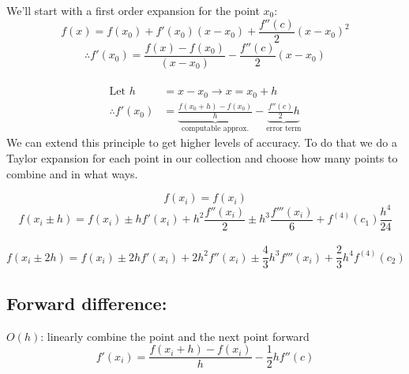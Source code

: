 \documentclass[12pt, answers]{exam}
\begin{document}
We'll start with a first order expansion for the point $x_0$:
\[
f(x) = f(x_0) + f'(x_0)(x - x_0) + \frac{f''(c)}{2}(x-x_0)^2 \]
\ifprintanswers
\[
\therefore f'(x_0) = \frac{f(x) - f(x_0)}{(x - x_0)} - \frac{f''(c)}{2}(x-x_0) \]
\else
\\\vspace*{2em}
\fi
%
\begin{align*}
\text{Let } h &= x-x_0 \rightarrow x = x_0 + h \\
%
\therefore f'(x_0) &= \underbrace{\frac{f(x_0 + h) - f(x_0)}{h}}_{\text{computable approx.}} - \underbrace{\frac{f''(c)}{2}h}_{\text{error term}}
\end{align*}
%
We can extend this principle to get higher levels of accuracy. To do that we do a Taylor expansion for each point in our collection and choose how many points to combine and in what ways. 
%
\begin{center}
\end{center}
%

\[
f(x_i) = f(x_i)\]
%
\ifprintanswers
\[
f(x_i \pm h) = f(x_i) \pm hf'(x_i) + h^2\frac{f''(x_i)}{2} \pm h^3\frac{f'''(x_i)}{6} + f^{(4)}(c_1)\frac{h^4}{24} \]
\else
\\\vspace*{2em}
\fi
%
\[
f(x_i \pm 2h) = f(x_i) \pm 2h f'(x_i) + 2 h^2 f''(x_i) \pm \frac{4}{3} h^3 f'''(x_i) + \frac{2}{3}h^4 f^{(4)}(c_2)\]


\subsection*{Forward difference:}
\underline{$O(h)$}: linearly combine the point and the next point forward
\[f'(x_i) = \frac{f(x_i + h) - f(x_i)}{h} - \frac{1}{2}hf''(c)\]
\end{document}
